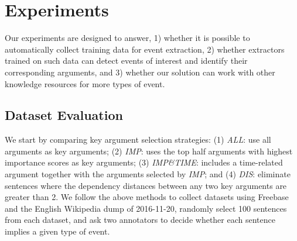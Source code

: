 \section{Experiments}
Our experiments are designed to answer, %
1) whether it is possible to automatically collect training data for event extraction,
2) whether  extractors trained on such data can detect events of interest and identify
their corresponding arguments,
and 3) whether our solution can work with other knowledge resources for more types of event.

 \subsection{Dataset Evaluation}\label{sec:evalhypo}
We start by comparing key argument selection strategies: %
(1) \emph{ALL}: use all arguments as key arguments; (2) \emph{IMP}: 
uses the top half arguments with highest importance scores as key arguments;
(3) \emph{IMP\&TIME}:  includes a time-related argument together with  the arguments selected by \emph{IMP}; 
and (4) \emph{DIS}: eliminate sentences where the dependency distances
 between any two key arguments are greater than 2.
We follow the above methods to collect datasets using Freebase and the English Wikipedia dump of 2016-11-20,
randomly select 100 sentences from each dataset, and ask two annotators to decide whether each sentence implies a given type of event.




